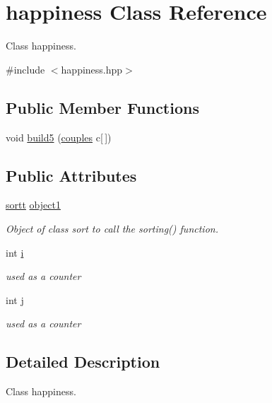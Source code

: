 \hypertarget{classhappiness}{\section{happiness Class Reference}
\label{classhappiness}
}


Class happiness.  




{\ttfamily \#include $<$happiness.\-hpp$>$}

\subsection*{Public Member Functions}
\begin{DoxyCompactItemize}
\item 
void \hyperlink{classhappiness_afec11fae49f894a218a18d3045c91f2f}{build5} (\hyperlink{classcouples}{couples} c\mbox{[}$\,$\mbox{]})
\end{DoxyCompactItemize}
\subsection*{Public Attributes}
\begin{DoxyCompactItemize}
\item 
\hyperlink{classsortt}{sortt} \hyperlink{classhappiness_aa50fd7c58dcf3b1417b850b810e9fc46}{object1}
\begin{DoxyCompactList}\small\item\em Object of class sort to call the sorting() function. \end{DoxyCompactList}\item 
int \hyperlink{classhappiness_a4905276b4758b5b8311af649c64dc207}{i}
\begin{DoxyCompactList}\small\item\em used as a counter \end{DoxyCompactList}\item 
int \hyperlink{classhappiness_a7b345b9de54e516c6003413589b6435c}{j}
\begin{DoxyCompactList}\small\item\em used as a counter \end{DoxyCompactList}\end{DoxyCompactItemize}


\subsection{Detailed Description}
Class happiness. 

